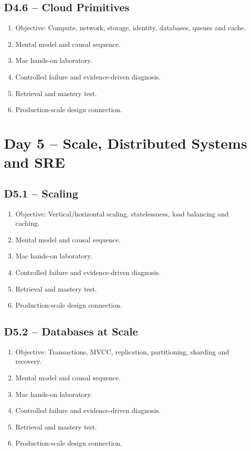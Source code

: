 \documentclass[11pt,a4paper]{book}
\begin{document}
\section{D4.6 -- Cloud Primitives}
\begin{enumerate}
\item Objective: Compute, network, storage, identity, databases, queues and cache.
\item Mental model and causal sequence.
\item Mac hands-on laboratory.
\item Controlled failure and evidence-driven diagnosis.
\item Retrieval and mastery test.
\item Production-scale design connection.
\end{enumerate}
\chapter{Day 5 -- Scale, Distributed Systems and SRE}
\section{D5.1 -- Scaling}
\begin{enumerate}
\item Objective: Vertical/horizontal scaling, statelessness, load balancing and caching.
\item Mental model and causal sequence.
\item Mac hands-on laboratory.
\item Controlled failure and evidence-driven diagnosis.
\item Retrieval and mastery test.
\item Production-scale design connection.
\end{enumerate}
\section{D5.2 -- Databases at Scale}
\begin{enumerate}
\item Objective: Transactions, MVCC, replication, partitioning, sharding and recovery.
\item Mental model and causal sequence.
\item Mac hands-on laboratory.
\item Controlled failure and evidence-driven diagnosis.
\item Retrieval and mastery test.
\item Production-scale design connection.
\end{enumerate}
\end{document}
